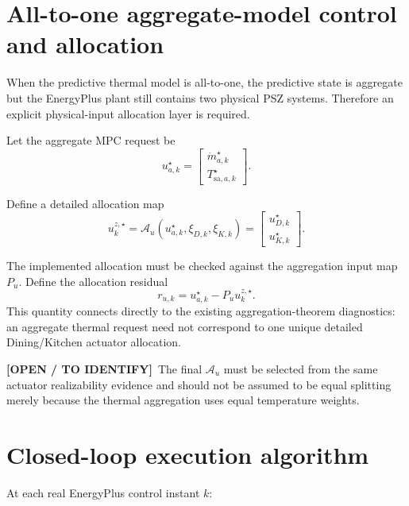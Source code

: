 \documentclass[11pt]{article}
\newcommand{\mdot}{\dot m}
\newcommand{\OpenItem}{\textbf{[OPEN / TO IDENTIFY]}}
\begin{document}
\section{All-to-one aggregate-model control and allocation}

When the predictive thermal model is all-to-one, the predictive state is
aggregate but the EnergyPlus plant still contains two physical PSZ systems.
Therefore an explicit physical-input allocation layer is required.

Let the aggregate MPC request be
\begin{equation}
u_{a,k}^{\star}
=
\begin{bmatrix}
\mdot_{a,k}^{\star}\\
T_{\mathrm{sa},a,k}^{\star}
\end{bmatrix}.
\end{equation}

Define a detailed allocation map
\begin{equation}
u_{k}^{z,\star}
=
\mathcal A_u
\left(
u_{a,k}^{\star},
\xi_{D,k},
\xi_{K,k}
\right)
=
\begin{bmatrix}
u_{D,k}^{\star}\\
u_{K,k}^{\star}
\end{bmatrix}.
\label{eq:aggregate-allocation}
\end{equation}

The implemented allocation must be checked against the aggregation input map
$P_u$.  Define the allocation residual
\begin{equation}
r_{u,k}
=
u_{a,k}^{\star}
-
P_u u_{k}^{z,\star}.
\label{eq:allocation-residual}
\end{equation}
This quantity connects directly to the existing aggregation-theorem diagnostics:
an aggregate thermal request need not correspond to one unique detailed
Dining/Kitchen actuator allocation.

\OpenItem\ The final $\mathcal A_u$ must be selected from the same actuator
realizability evidence and should not be assumed to be equal splitting merely
because the thermal aggregation uses equal temperature weights.

\section{Closed-loop execution algorithm}

At each real EnergyPlus control instant $k$:
\end{document}
